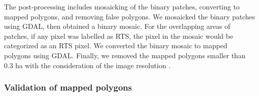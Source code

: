 \documentclass[authoryear,preprint,review,12pt]{elsarticle}
\begin{document}
The post-processing includes mosaicking of the binary patches, converting to mapped polygons, and removing false polygons. We mosaicked the binary patches using GDAL, then obtained a binary mosaic. For the overlapping areas of patches, if any pixel was labelled as RTS, the pixel in the mosaic would be categorized as an RTS pixel. We converted the binary mosaic to mapped polygons using GDAL. Finally, we removed the mapped polygons  smaller than 0.3 ha with the consideration of the image resolution .  

\subsubsection{Validation of mapped polygons}
\label{subsubsec_validation}
\end{document}
